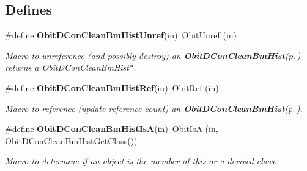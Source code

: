 \subsection*{Defines}
\begin{CompactItemize}
\item 
\#define {\bf Obit\-DCon\-Clean\-Bm\-Hist\-Unref}(in)\ Obit\-Unref (in)
\begin{CompactList}\small\item\em Macro to unreference (and possibly destroy) an {\bf Obit\-DCon\-Clean\-Bm\-Hist}{\rm (p.\,\pageref{structObitDConCleanBmHist})} returns a Obit\-DCon\-Clean\-Bm\-Hist$\ast$. \item\end{CompactList}\item 
\#define {\bf Obit\-DCon\-Clean\-Bm\-Hist\-Ref}(in)\ Obit\-Ref (in)
\begin{CompactList}\small\item\em Macro to reference (update reference count) an {\bf Obit\-DCon\-Clean\-Bm\-Hist}{\rm (p.\,\pageref{structObitDConCleanBmHist})}. \item\end{CompactList}\item 
\#define {\bf Obit\-DCon\-Clean\-Bm\-Hist\-Is\-A}(in)\ Obit\-Is\-A (in, Obit\-DCon\-Clean\-Bm\-Hist\-Get\-Class())
\begin{CompactList}\small\item\em Macro to determine if an object is the member of this or a derived class. \item\end{CompactList}\end{CompactItemize}
